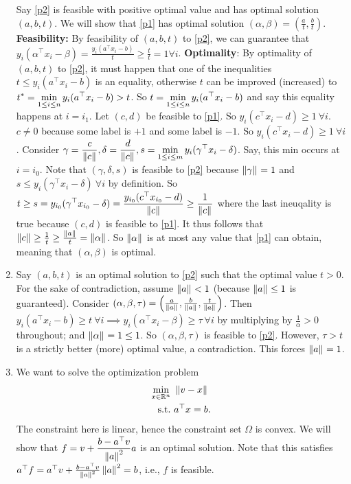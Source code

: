 \begin{enumerate}[leftmargin=*]
Say \ref{p2} is feasible with positive optimal value and has optimal solution $(a,b,t)$. We will show that \ref{p1} has optimal solution $(\alpha,\beta)=\left(\frac{a}{t},\frac bt\right)$. \\
\textbf{Feasibility:} By feasibility of $(a,b,t)$ to \ref{p2}, we can guarantee that $y_{i}(\alpha^{\top}x_{i}-\beta) = \frac{y_{i}(a^{\top}x_{i}-b)}{t} \ge \frac{t}{t} = 1\forall i$.
\textbf{Optimality}: By optimality of $(a,b,t)$ to \ref{p2}, it must happen that one of the inequalities $t\le y_{i}(a^{\top}x_{i}-b)$ is an equality, otherwise $t$ can be improved (increased) to $\displaystyle t^{*}=\min_{1\le i\le n}y_{i}(a^{\top}x_{i}-b) > t$. So $\displaystyle t=\min_{1\le i\le n}y_{i}(a^{\top}x_{i}-b)$ and say this equality happens at $i=i_{1}$. Let $(c,d)$ be feasible to \ref{p1}. So $y_{i}(c^{\top}x_{i}-d)\ge 1~\forall i$. $c\ne 0$ because some label is $+1$ and some label is $-1$. So $y_{i}(c^{\top}x_{i}-d)\ge 1~\forall i$. Consider $\displaystyle\gamma=\frac{c}{\left\lVert c \right\rVert_{}}, \delta = \frac{d}{\left\lVert c \right\rVert_{}}, s=\min_{1\le i\le m} y_{i}(\gamma^{\top}x_{i}-\delta)$. Say, this min occurs at $i=i_{0}$. Note that $(\gamma,\delta,s)$ is feasible to \ref{p2} because $\left\lVert \gamma \right\rVert_{}=1$ and $s\le y_{i}(\gamma^{\top}x_{i}-\delta)~\forall i$ by definition. So $\displaystyle t \ge s = y_{i_{0}}(\gamma^{\top}x_{i_{0}}-\delta) = \frac{y_{i_{0}}(c^{\top}x_{i_{0}}-d)}{\left\lVert c \right\rVert_{}} \ge \frac{1}{\left\lVert c \right\rVert_{}}$ where the last ineuqality is true because $(c,d)$ is feasible to \ref{p1}. It thus follows that $\left\lVert c \right\rVert_{} \ge \frac{1}{t} \ge \frac{\left\lVert a \right\rVert_{}}{t} = \left\lVert \alpha \right\rVert_{}$. So $\left\lVert \alpha \right\rVert_{}$ is at most any value that \ref{p1} can obtain, meaning that $(\alpha,\beta)$ is optimal.
\item Say $(a,b,t)$ is an optimal solution to \ref{p2} such that the optimal value $t>0$. For the sake of contradiction, assume $\left\lVert a \right\rVert_{}<1$ (because $\left\lVert a \right\rVert_{}\le 1$ is guaranteed). Consider $(\alpha,\beta,\tau) = \left(\frac{a}{\left\lVert a \right\rVert_{}},\frac{b}{\left\lVert a \right\rVert_{}}, \frac{t}{\left\lVert a \right\rVert_{}}\right)$. Then $y_{i}(a^{\top}x_{i}-b)\ge t~\forall i\implies y_{i}(\alpha^{\top}x_{i}-\beta)\ge \tau~\forall i$ by multiplying by $\frac{1}{\alpha}>0$ throughout; and $\left\lVert \alpha \right\rVert_{}=1\le 1$. So $(\alpha,\beta,\tau)$ is feasible to \ref{p2}. However, $\tau > t$ is a strictly better (more) optimal value, a contradiction. This forces $\left\lVert a \right\rVert_{}=1$.

\item We want to solve the optimization problem
\begin{align*}
\min_{x\in\mathbb{R}^{n}} &~\left\lVert v-x \right\rVert_{}\\
\text{s.t.} &~a^{\top}x=b.
\end{align*}
The constraint here is linear, hence the constraint set $\Omega$ is convex. We will show that $\displaystyle f = v + \frac{b-a^{\top}v}{\left\lVert a \right\rVert_{}^{2}}a$ is an optimal solution. Note that this satisfies $a^{\top}f=a^{\top}v + \frac{b-a^{\top}v}{\left\lVert a \right\rVert_{}^{2}} \left\lVert a \right\rVert_{}^{2} = b$, i.e., $f$ is feasible.%


\end{enumerate}
